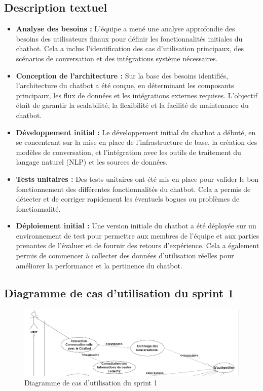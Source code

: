 \documentclass[a4paper, 11pt, openany]{report}
\begin{document}
\subsection{Description textuel}

\begin{itemize}
    \item \textbf{Analyse des besoins :} L'équipe a mené une analyse approfondie des besoins des utilisateurs finaux pour définir les fonctionnalités initiales du chatbot. Cela a inclus l'identification des cas d'utilisation principaux, des scénarios de conversation et des intégrations système nécessaires.
    
    \item \textbf{Conception de l'architecture :} Sur la base des besoins identifiés, l'architecture du chatbot a été conçue, en déterminant les composants principaux, les flux de données et les intégrations externes requises. L'objectif était de garantir la scalabilité, la flexibilité et la facilité de maintenance du chatbot.
    
    \item \textbf{Développement initial :} Le développement initial du chatbot a débuté, en se concentrant sur la mise en place de l'infrastructure de base, la création des modèles de conversation, et l'intégration avec les outils de traitement du langage naturel (NLP) et les sources de données.
    
    \item \textbf{Tests unitaires :} Des tests unitaires ont été mis en place pour valider le bon fonctionnement des différentes fonctionnalités du chatbot. Cela a permis de détecter et de corriger rapidement les éventuels bogues ou problèmes de fonctionnalité.
    
    \item \textbf{Déploiement initial :} Une version initiale du chatbot a été déployée sur un environnement de test pour permettre aux membres de l'équipe et aux parties prenantes de l'évaluer et de fournir des retours d'expérience. Cela a également permis de commencer à collecter des données d'utilisation réelles pour améliorer la performance et la pertinence du chatbot.
\end{itemize}

\subsection{Diagramme de cas d'utilisation du sprint 1}
\begin{figure}[H]
\centering
\includegraphics[width=\textwidth]{sprint1-usecase.png}
\caption{Diagramme de cas d'utilisation du sprint 1}
\label{fig:sprint1_usecase}
\end{figure}
\FloatBarrier
\end{document}
